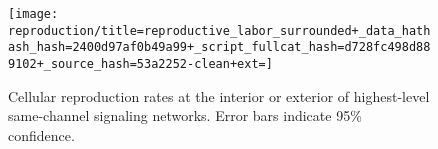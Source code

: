 \begin{figure}[!htbp]
\begin{center}

\texttt{[image: reproduction/title=reproductive\_labor\_surrounded+\_data\_hathash\_hash=2400d97af0b49a99+\_script\_fullcat\_hash=d728fc498d889102+\_source\_hash=53a2252-clean+ext=]}

\caption{
Cellular reproduction rates at the interior or exterior of highest-level same-channel signaling networks.
Error bars indicate 95\% confidence.
}
\label{fig:reproduction_surrounded}
\end{center}
\end{figure}
